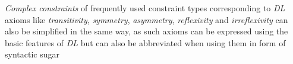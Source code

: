 \documentclass[a4paper,fontsize=11pt]{scrartcl}
\newcommand{\ms}[1]{\texttt{#1}}
\newenvironment{DL}{
  \vspace{0cm}
	\begin{center}
  \begin{tabular}{r l}

}{
  \end{tabular}
	\end{center}
}
\begin{document}
\emph{Complex constraints} of frequently used constraint types corresponding to \emph{DL} axioms like 
\emph{transitivity}, \emph{symmetry}, \emph{asymmetry}, \emph{reflexivity} and \emph{irreflexivity}
can also be simplified in the same way, 
as such axioms can be expressed using the basic features of \emph{DL} but can also be abbreviated when using them in form of syntactic sugar \cite{BoschEckert2015-2}
%
%
%
%
%
\end{document}
